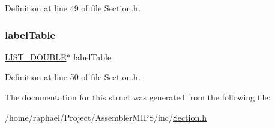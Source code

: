 Definition at line 49 of file Section.\+h.

\mbox{\label{struct_c_o_l_l_e_c_t_i_o_n___l_i_s_t_s_a83d08c725eace4faa2dce93921c1a025}} 
\subsubsection{\texorpdfstring{label\+Table}{labelTable}}
{\footnotesize\ttfamily \mbox{\hyperlink{_double_list_generic_8h_a1e5b384fadfbaaa8da74a3c3212fae13}{L\+I\+S\+T\+\_\+\+D\+O\+U\+B\+LE}}$\ast$ label\+Table}



Definition at line 50 of file Section.\+h.



The documentation for this struct was generated from the following file\+:\begin{DoxyCompactItemize}
\item 
/home/raphael/\+Project/\+Assembler\+M\+I\+P\+S/inc/\mbox{\hyperlink{_section_8h}{Section.\+h}}\end{DoxyCompactItemize}
